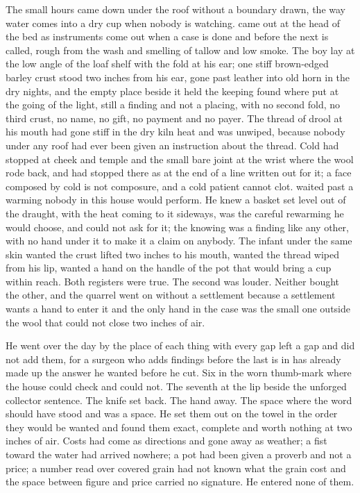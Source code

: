 The small hours came down under the roof without a boundary drawn, the way water comes into a dry cup when nobody is watching.  came out at the head of the bed as instruments come out when a case is done and before the next is called, rough from the wash and smelling of tallow and low smoke. The boy lay at the low angle of the loaf shelf with the fold at his ear; one stiff brown-edged barley crust stood two inches from his ear, gone past leather into old horn in the dry nights, and the empty place beside it held the keeping found where put at the going of the light, still a finding and not a placing, with no second fold, no third crust, no name, no gift, no payment and no payer. The thread of drool at his mouth had gone stiff in the dry kiln heat and was unwiped, because nobody under any roof had ever been given an instruction about the thread. Cold had stopped at cheek and temple and the small bare joint at the wrist where the wool rode back, and had stopped there as at the end of a line written out for it; a face composed by cold is not composure, and a cold patient cannot clot.  waited past a warming nobody in this house would perform. He knew a basket set level out of the draught, with the heat coming to it sideways, was the careful rewarming he would choose, and could not ask for it; the knowing was a finding like any other, with no hand under it to make it a claim on anybody. The infant under the same skin wanted the crust lifted two inches to his mouth, wanted the thread wiped from his lip, wanted a hand on the handle of the pot that would bring a cup within reach. Both registers were true. The second was louder. Neither bought the other, and the quarrel went on without a settlement because a settlement wants a hand to enter it and the only hand in the case was the small one outside the wool that could not close two inches of air.

He went over the day by the place of each thing with every gap left a gap and did not add them, for a surgeon who adds findings before the last is in has already made up the answer he wanted before he cut. Six in the worn thumb-mark where the house could check and could not. The seventh at the lip beside the unforged collector sentence. The knife set back. The hand away. The space where the word should have stood and was a space. He set them out on the towel in the order they would be wanted and found them exact, complete and worth nothing at two inches of air. Costs had come as directions and gone away as weather; a fist toward the water had arrived nowhere; a pot had been given a proverb and not a price; a number read over covered grain had not known what the grain cost and the space between figure and price carried no signature. He entered none of them.

